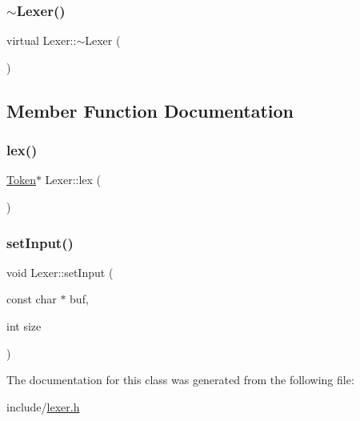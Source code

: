 \subsubsection{\texorpdfstring{$\sim$\+Lexer()}{~Lexer()}}
{\footnotesize\ttfamily virtual Lexer\+::$\sim$\+Lexer (\begin{DoxyParamCaption}{ }\end{DoxyParamCaption})\hspace{0.3cm}{\ttfamily [virtual]}}



\subsection{Member Function Documentation}
\mbox{\label{classLexer_ad86200e5fb0cbd86882edf63555ebb08}} 
\subsubsection{\texorpdfstring{lex()}{lex()}}
{\footnotesize\ttfamily \hyperlink{classToken}{Token}$\ast$ Lexer\+::lex (\begin{DoxyParamCaption}{ }\end{DoxyParamCaption})}

\mbox{\label{classLexer_aec0b93e8614e2327341c73c2adda68c6}} 
\subsubsection{\texorpdfstring{set\+Input()}{setInput()}}
{\footnotesize\ttfamily void Lexer\+::set\+Input (\begin{DoxyParamCaption}\item[{const char $\ast$}]{buf,  }\item[{int}]{size }\end{DoxyParamCaption})}



The documentation for this class was generated from the following file\+:\begin{DoxyCompactItemize}
\item 
include/\hyperlink{lexer_8h}{lexer.\+h}\end{DoxyCompactItemize}
